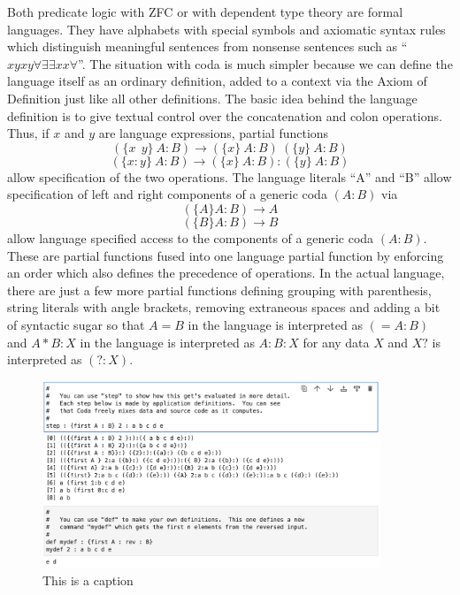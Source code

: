 \documentclass[11pt]{article}
\begin{document}
Both predicate logic with ZFC or with dependent type theory are formal languages.  They have alphabets with special symbols 
and axiomatic syntax rules which 
distinguish meaningful sentences from nonsense sentences such as ``$xyxy\forall\exists\exists x x\forall$''.  The situation with coda is 
much simpler because we can define the language itself as an ordinary definition, added to a context via the Axiom of Definition just 
like all other definitions.  The basic idea behind the language definition is to give textual control over the concatenation and colon operations.
Thus, if $x$ and $y$ are language expressions, partial functions 
\begin{equation} \label{eqn} 
( \{x\ \ y\} \ A : B ) \rightarrow (\{x\}\ A : B)\ (\{y\}\ A : B)
\end{equation} 
\begin{equation} \label{eqn} 
( \{x : y\} \ A : B ) \rightarrow (\{x\}\ A : B):(\{y\}\ A : B) 
\end{equation} 
allow specification of the two operations.  The language literals ``A'' and ``B'' allow specification of left and right 
components of a generic coda $(A:B)$ via 
\begin{equation}\label{eqn}
(\{A\} A:B)\rightarrow A
\end{equation}
\begin{equation}\label{eqn}
(\{B\} A:B)\rightarrow B
\end{equation}
allow language specified access to the components of a generic coda $(A:B)$.
These are partial functions fused into one language partial function by enforcing an order which also defines the precedence of operations.  
In the actual language, there are just  a few more partial functions defining grouping with parenthesis, string literals with angle brackets, 
removing extraneous spaces and adding a bit of syntactic sugar so that $A=B$ in the language is interpreted 
as $(= A:B)$ and $A*B:X$ in the language is interpreted as $A:B:X$ for any data $X$ and $X?$ is interpreted as $(?:X)$.   
\begin{figure}[h]
\centering
\includegraphics[width=0.9\textwidth]{language_examples.png}
\caption{This is a caption}
\end{figure} 
\end{document}
